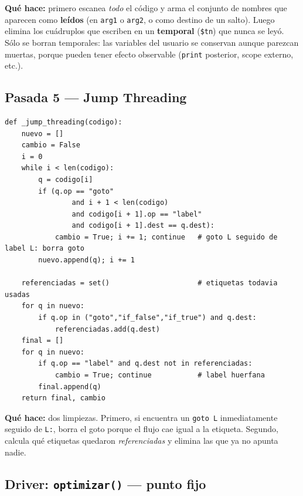 \documentclass[11pt,a4paper]{article}
\begin{document}
\textbf{Qué hace:} primero escanea \emph{todo} el código y arma el conjunto
de nombres que aparecen como \textbf{leídos} (en \texttt{arg1} o
\texttt{arg2}, o como destino de un salto). Luego elimina los cuádruplos
que escriben en un \textbf{temporal} (\texttt{\$tn}) que nunca se leyó.
Sólo se borran temporales: las variables del usuario se conservan aunque
parezcan muertas, porque pueden tener efecto observable
(\texttt{print} posterior, scope externo, etc.).

\subsection{Pasada 5 --- Jump Threading}

\begin{lstlisting}[style=py]
def _jump_threading(codigo):
    nuevo = []
    cambio = False
    i = 0
    while i < len(codigo):
        q = codigo[i]
        if (q.op == "goto"
                and i + 1 < len(codigo)
                and codigo[i + 1].op == "label"
                and codigo[i + 1].dest == q.dest):
            cambio = True; i += 1; continue   # goto L seguido de label L: borra goto
        nuevo.append(q); i += 1

    referenciadas = set()                     # etiquetas todavia usadas
    for q in nuevo:
        if q.op in ("goto","if_false","if_true") and q.dest:
            referenciadas.add(q.dest)
    final = []
    for q in nuevo:
        if q.op == "label" and q.dest not in referenciadas:
            cambio = True; continue           # label huerfana
        final.append(q)
    return final, cambio
\end{lstlisting}

\textbf{Qué hace:} dos limpiezas. Primero, si encuentra un
\texttt{goto L} inmediatamente seguido de \texttt{L:}, borra el goto
porque el flujo cae igual a la etiqueta. Segundo, calcula qué etiquetas
quedaron \emph{referenciadas} y elimina las que ya no apunta nadie.

\subsection{Driver: \texttt{optimizar()} --- punto fijo}
\end{document}
